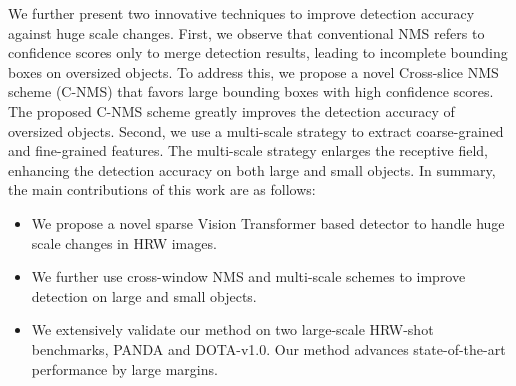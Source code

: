 We further present two innovative techniques to improve detection accuracy against huge scale changes. 
%
First, we observe that conventional NMS refers to confidence scores only to merge detection results, leading to incomplete bounding boxes on oversized objects. To address this, we propose a novel Cross-slice NMS scheme (C-NMS) that favors large bounding boxes with high confidence scores. The proposed C-NMS scheme greatly improves the detection accuracy of oversized objects. 
%
Second, we use a multi-scale strategy to extract coarse-grained and fine-grained features. The multi-scale strategy enlarges the receptive field, enhancing the detection accuracy on both large and small objects. 
%
In summary, the main contributions of this work are as follows:


\begin{itemize}
\item
We propose a novel sparse Vision Transformer based detector to handle huge scale changes in HRW images. 
\item
We further use cross-window NMS and multi-scale schemes to improve detection on large and small objects.
\item 
We extensively validate our method on two large-scale HRW-shot benchmarks, PANDA and DOTA-v1.0. Our method advances state-of-the-art performance by large margins. 
\end{itemize}

